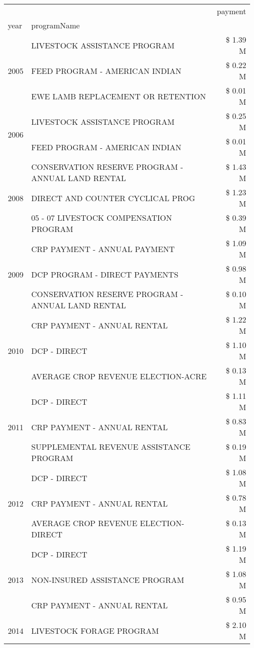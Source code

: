 \begin{tabular}{llr}
\toprule
 &  & payment \\
year & programName &  \\
\midrule
\multirow[t]{3}{*}{2005} & LIVESTOCK ASSISTANCE PROGRAM & \$ 1.39 M \\
 & FEED PROGRAM - AMERICAN INDIAN & \$ 0.22 M \\
 & EWE LAMB REPLACEMENT OR RETENTION & \$ 0.01 M \\
\cline{1-3}
\multirow[t]{2}{*}{2006} & LIVESTOCK ASSISTANCE PROGRAM & \$ 0.25 M \\
 & FEED PROGRAM - AMERICAN INDIAN & \$ 0.01 M \\
\cline{1-3}
\multirow[t]{3}{*}{2008} & CONSERVATION RESERVE PROGRAM - ANNUAL LAND RENTAL & \$ 1.43 M \\
 & DIRECT AND COUNTER CYCLICAL PROG & \$ 1.23 M \\
 & 05 - 07 LIVESTOCK COMPENSATION PROGRAM & \$ 0.39 M \\
\cline{1-3}
\multirow[t]{3}{*}{2009} & CRP PAYMENT - ANNUAL PAYMENT & \$ 1.09 M \\
 & DCP PROGRAM - DIRECT PAYMENTS & \$ 0.98 M \\
 & CONSERVATION RESERVE PROGRAM - ANNUAL LAND RENTAL & \$ 0.10 M \\
\cline{1-3}
\multirow[t]{3}{*}{2010} & CRP PAYMENT - ANNUAL RENTAL & \$ 1.22 M \\
 & DCP - DIRECT & \$ 1.10 M \\
 & AVERAGE CROP REVENUE ELECTION-ACRE & \$ 0.13 M \\
\cline{1-3}
\multirow[t]{3}{*}{2011} & DCP - DIRECT & \$ 1.11 M \\
 & CRP PAYMENT - ANNUAL RENTAL & \$ 0.83 M \\
 & SUPPLEMENTAL REVENUE ASSISTANCE PROGRAM & \$ 0.19 M \\
\cline{1-3}
\multirow[t]{3}{*}{2012} & DCP - DIRECT & \$ 1.08 M \\
 & CRP PAYMENT - ANNUAL RENTAL & \$ 0.78 M \\
 & AVERAGE CROP REVENUE ELECTION-DIRECT & \$ 0.13 M \\
\cline{1-3}
\multirow[t]{3}{*}{2013} & DCP - DIRECT & \$ 1.19 M \\
 & NON-INSURED ASSISTANCE PROGRAM & \$ 1.08 M \\
 & CRP PAYMENT - ANNUAL RENTAL & \$ 0.95 M \\
\cline{1-3}
\multirow[t]{3}{*}{2014} & LIVESTOCK FORAGE PROGRAM & \$ 2.10 M \\

\end{tabular}
